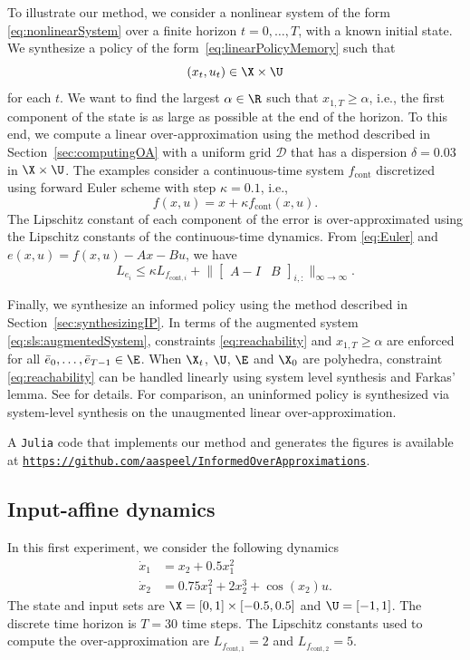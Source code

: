 \documentclass[letterpaper, 10 pt, conference]{ieeeconf}  %
\begin{document}
To illustrate our method, we consider a nonlinear system of the form \eqref{eq:nonlinearSystem} over a finite horizon $t=0,\dots,T$, with a known initial state. We synthesize a policy of the form~\eqref{eq:linearPolicyMemory} such that
\begin{equation}\label{eq:reachability}
(x_t,u_t)\in\X\times\U
\end{equation}
for each $t$. We want to find the largest $\alpha\in\R$ such that $x_{1,T}\geq \alpha$, i.e., the first component of the state is as large as possible at the end of the horizon. To this end, we compute a linear over-approximation using the method described in Section~\ref{sec:computingOA} with a uniform grid $\mathcal{D}$ that has a dispersion $\delta=0.03$ in $\X\times\U$. The examples consider a continuous-time system $f_\text{cont}$ discretized using forward Euler scheme with step $\kappa=0.1$, i.e.,
\begin{equation}\label{eq:Euler}
f(x,u)=x+\kappa f_\text{cont}(x,u).
\end{equation}
The Lipschitz constant of each component of the error is over-approximated using the Lipschitz constants of the continuous-time dynamics. From \eqref{eq:Euler} and $e(x,u)=f(x,u)-Ax-Bu$, we have
$$
L_{e_i}\leq \kappa L_{f_{\text{cont},i}} +\lVert\begin{bmatrix}A-I & B\end{bmatrix}_{i,:}\rVert_{\infty\rightarrow\infty}.
$$

Finally, we synthesize an informed policy using the method described in Section~\ref{sec:synthesizingIP}. In terms of the augmented system \eqref{eq:sls:augmentedSystem}, constraints \eqref{eq:reachability} and $x_{1,T}\geq \alpha$ are enforced for all $\bar{e}_0,\dots, \bar{e}_{T-1}\in \E$. When $\X_t$, $\U$, $\E$ and $\X_0$ are polyhedra, constraint \eqref{eq:reachability} can be handled linearly using system level synthesis and Farkas' lemma. See \cite[Section~III-B]{aspeel2023low} for details. For comparison, an uninformed policy is synthesized via system-level synthesis on the unaugmented linear over-approximation.

A \texttt{Julia} code that implements our method and generates the figures is available at {\tt\small\url{https://github.com/aaspeel/InformedOverApproximations}}.


\subsection{Input-affine dynamics}
In this first experiment, we consider the following dynamics
\begin{subequations}\label{eq:inputAffineExperiment}
\begin{align}
\dot{x}_1&=x_2+0.5 x_1^2 \\
\dot{x}_2&=0.75x_1^2+2x_2^3+\cos(x_2)u.
\end{align}
\end{subequations}
The state and input sets are $\X=[0,1]\times[-0.5,0.5]$ and $\U=[-1,1]$. The discrete time horizon is $T=30$ time steps. The Lipschitz constants used to compute the over-approximation are $L_{f_{\text{cont},1}}=2$ and $L_{f_{\text{cont},2}}=5$.
\end{document}
